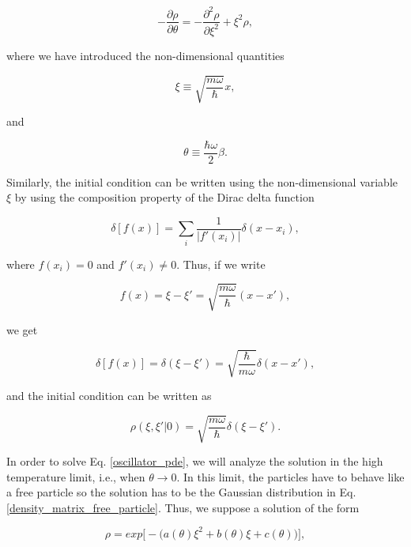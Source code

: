 \documentclass{article}
\begin{document}
\begin{equation}\label{oscillator_pde}
    -\frac{\partial \rho}{\partial \theta} = -\frac{\partial^{2} \rho}{\partial \xi^{2}} + \xi^{2}\rho,
\end{equation}

where we have introduced the non-dimensional quantities

\begin{equation}
    \xi \equiv \sqrt{\frac{m \omega}{\hbar}} x,
\end{equation}

and

\begin{equation}
    \theta \equiv \frac{\hbar \omega}{2} \beta.
\end{equation}

Similarly, the initial condition can be written using the non-dimensional variable $\xi$ by using the composition property of the Dirac delta function

\begin{equation}
    \delta[f(x)] = \sum_{i}\frac{1}{|f'(x_{i})|} \delta(x-x_{i}),
\end{equation}

where $f(x_{i})=0$ and $f'(x_i)\neq0$. Thus, if we write

\begin{equation}
    f(x)=\xi-\xi'=\sqrt{\frac{m\omega}{\hbar}}(x-x'),
\end{equation}

we get

\begin{equation}
    \delta[f(x)] = \delta(\xi-\xi')=\sqrt{\frac{\hbar}{m\omega}}\delta(x-x'),
\end{equation}

and the initial condition can be written as

\begin{equation}\label{oscillator_pde_initial_condition}
    \rho(\xi,\xi'|0) = \sqrt{\frac{m\omega}{\hbar}} \delta(\xi-\xi').
\end{equation}

In order to solve Eq. \ref{oscillator_pde}, we will analyze the solution in the high temperature limit, i.e., when $\theta \longrightarrow 0$. In this limit, the particles have to behave like a free particle so the solution has to be the Gaussian distribution in Eq. \ref{density_matrix_free_particle}. Thus, we suppose a solution of the form

\begin{equation}\label{oscillator_pre_solution}
    \rho = exp\big[-\big(a(\theta)\xi^{2} + b(\theta)\xi + c(\theta)\big)\big],
\end{equation}
\end{document}
